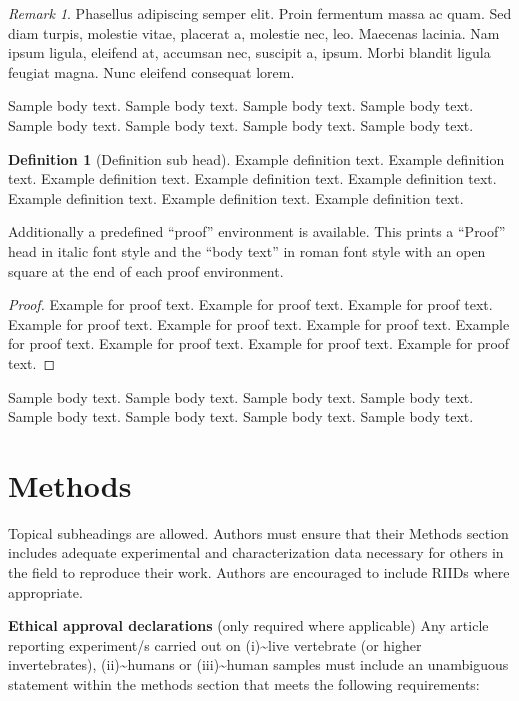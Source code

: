 \documentclass[sn-vancouver,Numbered,pdflatex]{sn-jnl}
\theoremstyle{remark}
\newtheorem{remark}{Remark}%
\theoremstyle{definition}
\newtheorem{definition}{Definition}%
\begin{document}
\begin{remark}
Phasellus adipiscing semper elit. Proin fermentum massa ac quam. Sed
diam turpis, molestie vitae, placerat a, molestie nec, leo. Maecenas
lacinia. Nam ipsum ligula, eleifend at, accumsan nec, suscipit a, ipsum.
Morbi blandit ligula feugiat magna. Nunc eleifend consequat lorem.

\end{remark}

Sample body text. Sample body text. Sample body text. Sample body text.
Sample body text. Sample body text. Sample body text. Sample body text.

\begin{definition}[Definition sub head]
Example definition text. Example definition text. Example definition
text. Example definition text. Example definition text. Example
definition text. Example definition text. Example definition text.

\end{definition}

Additionally a predefined ``proof'' environment is available. This
prints a ``Proof'' head in italic font style and the ``body text'' in
roman font style with an open square at the end of each proof
environment.

\begin{proof}
Example for proof text. Example for proof text. Example for proof text.
Example for proof text. Example for proof text. Example for proof text.
Example for proof text. Example for proof text. Example for proof text.
Example for proof text.

\end{proof}

Sample body text. Sample body text. Sample body text. Sample body text.
Sample body text. Sample body text. Sample body text. Sample body text.

\hypertarget{sec11}{%
\section{Methods}\label{sec11}}

Topical subheadings are allowed. Authors must ensure that their Methods
section includes adequate experimental and characterization data
necessary for others in the field to reproduce their work. Authors are
encouraged to include RIIDs where appropriate.

\textbf{Ethical approval declarations} (only required where applicable)
Any article reporting experiment/s carried out on
(i)\textasciitilde live vertebrate (or higher invertebrates),
(ii)\textasciitilde humans or (iii)\textasciitilde human samples must
include an unambiguous statement within the methods section that meets
the following requirements:
\end{document}
